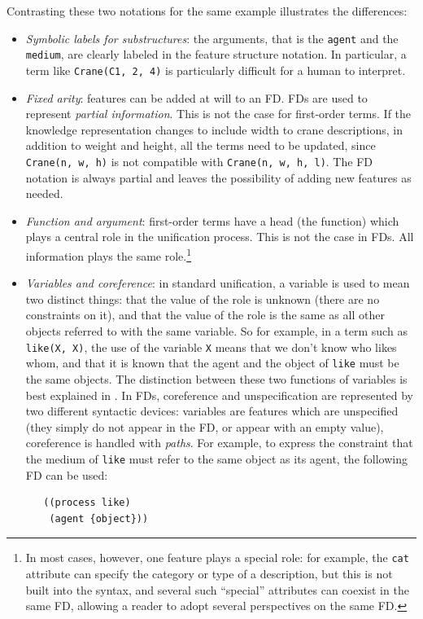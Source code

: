 \documentclass[10pt,a4paper]{report}
\begin{document}
Contrasting these two notations for the same example illustrates the differences: 
\begin{itemize}

\item {\em Symbolic labels for substructures}: the arguments, that is the {\tt agent}
and the {\tt medium}, are clearly labeled in the feature structure notation.
In particular, a term like {\tt Crane(C1, 2, 4)} is particularly difficult
for a human to interpret.

\item {\em Fixed arity}: features can be added at will to an FD.  FDs are used to
represent {\em partial information}.  This is not the case for first-order
terms.  If the knowledge representation changes to include width to crane
descriptions, in addition to weight and height, all the terms need to be
updated, since {\tt Crane(n, w, h)} is not compatible with {\tt Crane(n, w, h,
l)}.  The FD notation is always partial and leaves the possibility of
adding new features as needed.

\item {\em Function and argument}: first-order terms have a head (the function)
which plays a central role in the unification process.  This is not the
case in FDs.  All information plays the same role.\footnote{In most cases,
however, one feature plays a special role: for example, the {\tt cat}
attribute can specify the category or type of a description, but this is
not built into the syntax, and several such ``special'' attributes can
coexist in the same FD, allowing a reader to adopt several perspectives on
the same FD.}

\item {\em Variables and coreference}: in standard unification, a variable is used
to mean two distinct things: that the value of the role is unknown (there
are no constraints on it), and that the value of the role is the same as
all other objects referred to with the same variable.  So for example, in a
term such as {\tt like(X, X)}, the use of the variable {\tt X} means that we
don't know who likes whom, and that it is known that the agent and the
object of {\tt like} must be the same objects.  The distinction between these
two functions of variables is best explained in \cite{Ait-kaci}.  In FDs,
coreference and unspecification are represented by two different syntactic
devices: variables are features which are unspecified (they simply do not
appear in the FD, or appear with an empty value), coreference is handled
with {\em paths}.  For example, to express the constraint that the medium of
{\tt like} must refer to the same object as its agent, the following FD can
be used:
\begin{lstlisting}
   ((process like)    
    (agent {object})) 
\end{lstlisting} 

\end{itemize}
\end{document}
